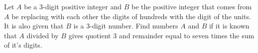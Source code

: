 Let $A$ be a $3$-digit positive integer and $B$ be the positive integer that comes from $A$ be replacing with each other the digits of hundreds with the digit of the units. It is also given that $B$ is a $3$-digit number.
Find numbers $A$ and $B$ if it is known that $A$ divided by $B$ gives quotient $3$ and remainder equal to seven times the sum of it's digits.